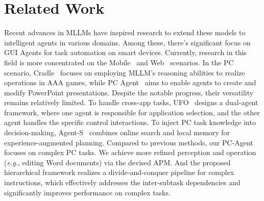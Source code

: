 \section{Related Work}
Recent advances in MLLMs \cite{hurst2024gpt,liu2024visual,wang2024qwen2} have 
inspired research to extend these models to intelligent agents in various domains.
Among these, there's significant focus on GUI Agents for task automation on smart devices.
Currently, research in this field is more concentrated on the Mobile~\cite{zhang2023appagent,wang2024mobilev1,hong2024cogagent} and Web~\cite{gur2023real,zheng2024gpt} scenarios. In the PC scenario, Cradle~\cite{tan2024cradle} focuses on employing MLLM's reasoning abilities to realize operations in AAA games, while PC Agent~\cite{he2024pc} aims to enable agents to create and modify PowerPoint presentations.
Despite the notable progress, their versatility remains relatively limited.
% 
To handle cross-app tasks, UFO~\cite{ufo} designs a dual-agent framework, where one agent is responsible for application selection, and the other agent handles the specific control interactions.
To inject PC task knowledge into decision-making, 
Agent-S~\cite{agashe2024agent} combines online search and local memory for experience-augmented planning.
% 
Compared to previous methods, our PC-Agent focuses on complex PC tasks.
We achieve more refined perception and operation (\textit{e.g.}, editing Word documents) via the devised APM.
And the proposed hierarchical framework realizes a divide-and-conquer pipeline for complex instructions, which effectively addresses the inter-subtask dependencies and significantly improves performance on complex tasks.